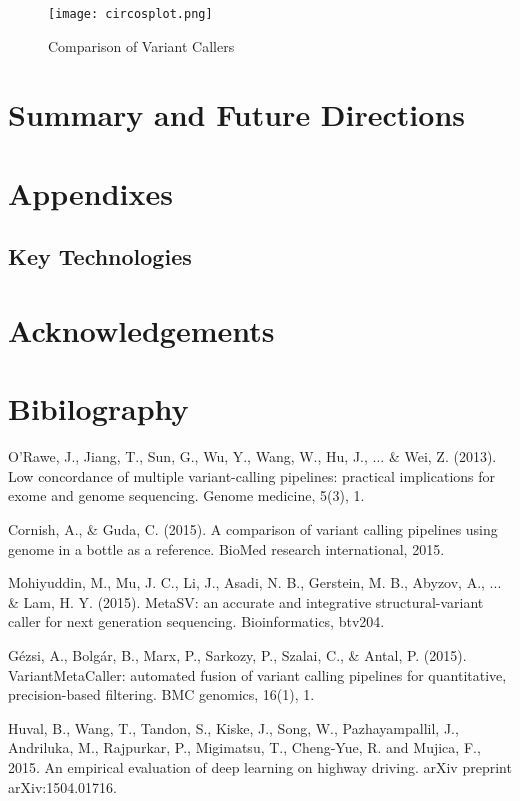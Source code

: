 \documentclass{article}
\begin{document}
\begin{figure}[H]
\texttt{[image: circosplot.png]}
\caption{Comparison of Variant Callers}
\centering
\end{figure}


\section{Summary and Future Directions}


\section{Appendixes}
\subsection{Key Technologies}


\section{Acknowledgements}

\section{Bibilography}

\begin{thebibliography}{9}
O'Rawe, J., Jiang, T., Sun, G., Wu, Y., Wang, W., Hu, J., ... \& Wei, Z. (2013). Low concordance of multiple variant-calling pipelines: practical implications for exome and genome sequencing. Genome medicine, 5(3), 1.
 
 Cornish, A., \& Guda, C. (2015). A comparison of variant calling pipelines using genome in a bottle as a reference. BioMed research international, 2015.

Mohiyuddin, M., Mu, J. C., Li, J., Asadi, N. B., Gerstein, M. B., Abyzov, A., ... \& Lam, H. Y. (2015). MetaSV: an accurate and integrative structural-variant caller for next generation sequencing. Bioinformatics, btv204.

Gézsi, A., Bolgár, B., Marx, P., Sarkozy, P., Szalai, C., \& Antal, P. (2015). VariantMetaCaller: automated fusion of variant calling pipelines for quantitative, precision-based filtering. BMC genomics, 16(1), 1.

Huval, B., Wang, T., Tandon, S., Kiske, J., Song, W., Pazhayampallil, J., Andriluka, M., Rajpurkar, P., Migimatsu, T., Cheng-Yue, R. and Mujica, F., 2015. An empirical evaluation of deep learning on highway driving. arXiv preprint arXiv:1504.01716.

\end{thebibliography}
\end{document}
